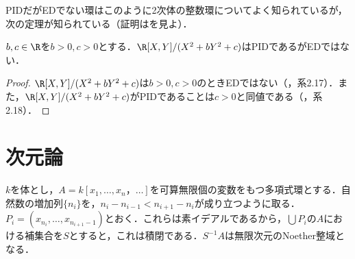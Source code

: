 PIDだがEDでない環はこのように2次体の整数環についてよく知られているが，次の定理が知られている（証明は\cite{goel2018nullstellenstze}を見よ）．

\begin{thm}
	$b,c\in\R$を$b>0,c>0$とする．$\R[X,Y]/(X^2+bY^2+c)$はPIDであるがEDではない．
\end{thm}

\begin{proof}
	$\R[X,Y]/(X^2+bY^2+c)$は$b>0,c>0$のときEDではない（\cite{goel2018nullstellenstze}，系2.17）．また，$\R[X,Y]/(X^2+bY^2+c)$がPIDであることは$c>0$と同値である（\cite{goel2018nullstellenstze}，系2.18）．
\end{proof}

\section{次元論}
\begin{surex}\label{ex:無限次元Noether環}
	$k$を体とし，$A=k[x_1,\dots,x_n，\dots]$を可算無限個の変数をもつ多項式環とする．自然数の増加列$\{n_i\}$を，$n_i-n_{i-1}<n_{i+1}-n_i$が成り立つように取る．$P_i=(x_{n_i},\dots,x_{n_{i+1}-1})$とおく．これらは素イデアルであるから，$\bigcup P_i$の$A$における補集合を$S$とすると，これは積閉である．$S^{-1}A$は無限次元のNoether整域となる．
\end{surex}

